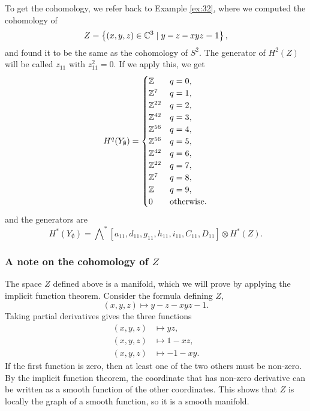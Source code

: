 To get the cohomology, we refer back to Example \ref{ex:32}, where we
computed the cohomology of
\[ Z=\left\{ (x,y,z)\in\mathbb{C}^3 \mid y-z-xyz = 1 \right\}, \]
and found it to be the same as the cohomology of $S^2$. The generator of
$H^2(Z)$ will be called $z_{11}$ with $z_{11}^2 = 0$. If we apply
this, we get
\[ H^q(Y_{\emptyset}) =
\begin{cases}
  \mathbb{Z} & q = 0, \\
  \mathbb{Z}^7 & q = 1, \\
    \mathbb{Z}^{22} & q = 2, \\
    \mathbb{Z}^{42} & q = 3, \\
    \mathbb{Z}^{56} & q = 4, \\
    \mathbb{Z}^{56} & q = 5, \\
    \mathbb{Z}^{42} & q = 6, \\
    \mathbb{Z}^{22} & q = 7, \\
    \mathbb{Z}^{7} & q = 8, \\
    \mathbb{Z} & q = 9, \\
    0 & \text{otherwise}.
  \end{cases} \] 
and the generators are
\[ H^*(Y_{\emptyset}) =
\bigwedge\nolimits^*[a_{11},d_{11},g_{11},h_{11},i_{11},C_{11},D_{11}]
\otimes H^*(Z). \]

\subsubsection{A note on the cohomology of $Z$}

The space $Z$ defined above is a manifold, which we will prove by
applying the implicit function theorem. Consider the formula defining
$Z$,
\[ (x,y,z) \mapsto y-z-xyz-1. \]
Taking partial derivatives gives the three functions
\begin{align*}
  (x,y,z) &\mapsto yz, \\
  (x,y,z) &\mapsto 1-xz, \\
  (x,y,z) &\mapsto -1-xy.
\end{align*}
If the first function is zero, then at least one of the two others
must be non-zero. By the implicit function theorem, the coordinate
that has non-zero derivative can be written as a smooth function of
the other coordinates. This shows that $Z$ is locally the graph of a
smooth function, so it is a smooth manifold.

